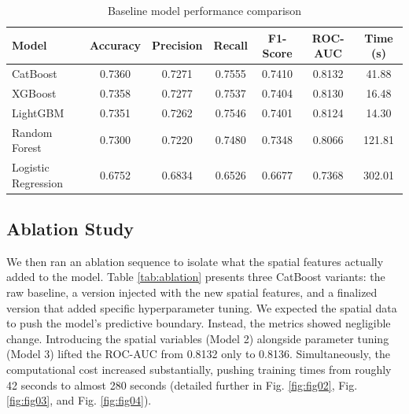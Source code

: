 \documentclass[runningheads]{llncs}
\begin{document}
\begin{table}[ht]
\centering
\caption{Baseline model performance comparison}
\label{tab:baseline}
\begin{tabular}{lcccccc}
\toprule
\textbf{Model} & \textbf{Accuracy} & \textbf{Precision} & \textbf{Recall} & \textbf{F1-Score} & \textbf{ROC-AUC} & \textbf{Time (s)} \\
\midrule
CatBoost & 0.7360 & 0.7271 & 0.7555 & 0.7410 & 0.8132 & 41.88 \\
XGBoost & 0.7358 & 0.7277 & 0.7537 & 0.7404 & 0.8130 & 16.48 \\
LightGBM & 0.7351 & 0.7262 & 0.7546 & 0.7401 & 0.8124 & 14.30 \\
Random Forest & 0.7300 & 0.7220 & 0.7480 & 0.7348 & 0.8066 & 121.81 \\
Logistic Regression & 0.6752 & 0.6834 & 0.6526 & 0.6677 & 0.7368 & 302.01 \\
\bottomrule
\end{tabular}
\end{table}

\subsection{Ablation Study}

We then ran an ablation sequence to isolate what the spatial features actually added to the model. Table \ref{tab:ablation} presents three CatBoost variants: the raw baseline, a version injected with the new spatial features, and a finalized version that added specific hyperparameter tuning. We expected the spatial data to push the model's predictive boundary. Instead, the metrics showed negligible change. Introducing the spatial variables (Model 2) alongside parameter tuning (Model 3) lifted the ROC-AUC from 0.8132 only to 0.8136. Simultaneously, the computational cost increased substantially, pushing training times from roughly 42 seconds to almost 280 seconds (detailed further in Fig. \ref{fig:fig02}, Fig. \ref{fig:fig03}, and Fig. \ref{fig:fig04}).

\begin{table}[ht]
\centering
\caption{CatBoost ablation study}
\label{tab:ablation}
\end{table}
\end{document}
